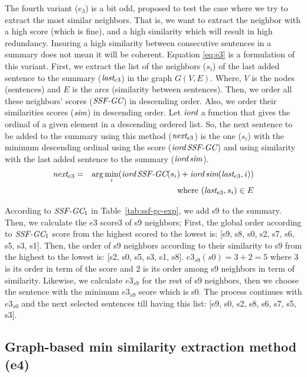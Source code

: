 The fourth variant ($ e_3 $) is a bit odd, proposed to test the case where we try to extract the most similar neighbors.
That is, we want to extract the neighbor with a high score (which is fine), and a high similarity which will result in high redundancy.
Insuring a high similarity between consecutive sentences in a summary does not mean it will be coherent. 
Equation \ref{eq:e3} is a formulation of this variant.
First, we extract the list of the neighbors ($s_i$) of the last added sentence to the summary ($\operatorname{\textit{last}}_{e3}$) in the graph $ G(V, E) $.
Where, $ V $ is the nodes (sentences) and $ E $ is the arcs (similarity between sentences). 
Then, we order all these neighbors' scores ($\operatorname{\textit{SSF-GC}}$) in descending order. 
Also, we order their similarities scores ($\operatorname{\textit{sim}}$) in descending order. 
Let $ \operatorname{\textit{iord}} $ a function that gives the ordinal of a given element in a descending ordered list.
So, the next sentence to be added to the summary using this method ($\operatorname{\textit{next}}_{e3}$) is the one ($s_i$) with the minimum descending ordinal using the score ($\operatorname{\textit{iord}}\operatorname{\textit{SSF-GC}}$) and using similarity with the last added sentence to the summary ($\operatorname{\textit{iord}}\operatorname{\textit{sim}}$).
\begin{equation}
	\begin{aligned}
		\operatorname{\textit{next}}_{e3} & = & \arg\min\limits_i (\operatorname{\textit{iord}}\operatorname{\textit{SSF-GC}}(s_i) + \operatorname{\textit{iord}}\operatorname{\textit{sim}}(\operatorname{\textit{last}}_{e3}, i)) \\
		&& \text{ where } (\operatorname{\textit{last}}_{e3}, s_i) \in E \\
	\end{aligned}
	\label{eq:e3}
\end{equation}

According to $ \operatorname{\textit{SSF-GC}}_1 $ in Table~\ref{tab:ssf-gc-exp}, we add s9 to the summary. 
Then, we calculate the $ e3 $ score3 of s9 neighbors; 
First, the global order according to $ \operatorname{\textit{SSF-GC}}_1 $ score from the highest scored to the lowest is: [s9, s8, s0, s2, s7, s6, s5, s3, s1].
Then, the order of s9 neighbors according to their similarity to s9 from the highest to the lowest is: [s2, s0, s5, s3, s1, s8].
$ e3_{s9}(s0) = 3 + 2 = 5 $ where $ 3 $ is its order in term of the score and $ 2 $ is its order among s9 neighbors in term of similarity. 
Likewise, we calculate $ e3_{s9} $ for the rest of s9 neighbors, then we choose the sentence with the minimum $ e3_{s9} $ score which is s0. 
The process continues with $ e3_{s0} $ and the next selected sentences till having this list: [e9, s0, s2, s8, s6, s7, s5, s3].

\subsection{Graph-based min similarity extraction method (e4)}

